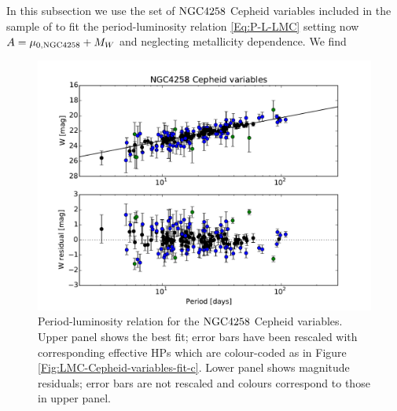 In this subsection we use the set of $\mathrm{NGC4258}$ Cepheid variables included in the sample of \cite{Riess:2011yx} to fit the period-luminosity relation \eqref{Eq:P-L-LMC} setting now $A = \mu_{0, \mathrm{NGC4258}} + M_W$ and neglecting metallicity dependence. We find
\begin{figure}[tbp]
\centering %
\includegraphics[width=\textwidth]{figures/chapter-h0/effective_HP_cepheids_NGC4258.pdf} 
\caption{Period-luminosity relation for the $\mathrm{NGC4258}$ Cepheid variables. Upper panel shows the best fit; error bars have been rescaled with corresponding effective HPs which are colour-coded as in Figure \ref{Fig:LMC-Cepheid-variables-fit-c}. Lower panel shows magnitude residuals; error bars are not rescaled and colours correspond to those in upper panel.}
\label{Fig:NGC4258-Cepheid-variables}
\end{figure}

